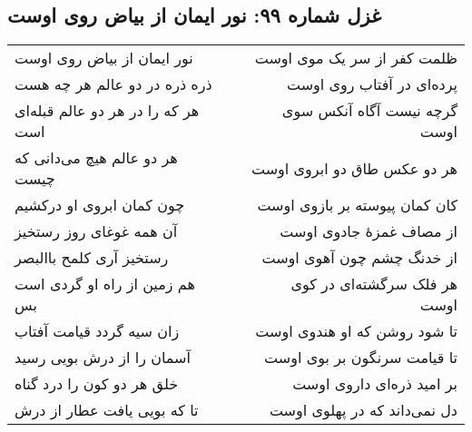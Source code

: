 \begin{center}
\section*{غزل شماره ۹۹: نور ایمان از بیاض روی اوست}
\label{sec:099}
\begin{longtable}{l p{0.5cm} r}
نور ایمان از بیاض روی اوست
&&
ظلمت کفر از سر یک موی اوست
\\
ذره ذره در دو عالم هر چه هست
&&
پرده‌ای در آفتاب روی اوست
\\
هر که را در هر دو عالم قبله‌ای است
&&
گرچه نیست آگاه آنکس سوی اوست
\\
هر دو عالم هیچ می‌دانی که چیست
&&
هر دو عکس طاق دو ابروی اوست
\\
چون کمان ابروی او درکشیم
&&
کان کمان پیوسته بر بازوی اوست
\\
آن همه غوغای روز رستخیز
&&
از مصاف غمزهٔ جادوی اوست
\\
رستخیز آری کلمح باالبصر
&&
از خدنگ چشم چون آهوی اوست
\\
هم زمین از راه او گردی است بس
&&
هر فلک سرگشته‌ای در کوی اوست
\\
زان سیه گردد قیامت آفتاب
&&
تا شود روشن که او هندوی اوست
\\
آسمان را از درش بویی رسید
&&
تا قیامت سرنگون بر بوی اوست
\\
خلق هر دو کون را درد گناه
&&
بر امید ذره‌ای داروی اوست
\\
تا که بویی یافت عطار از درش
&&
دل نمی‌داند که در پهلوی اوست
\\
\end{longtable}
\end{center}

